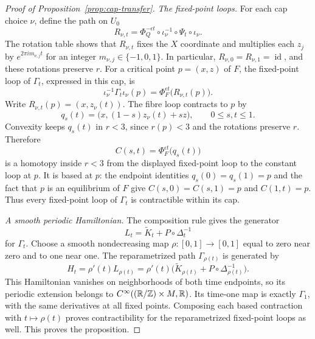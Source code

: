 \begin{proof}[Proof of Proposition~\ref{prop:cap-transfer}]
\smallskip
\noindent\emph{The fixed-point loops.}
For each cap choice $\nu$, define the path on $U_0$
\[
 R_{\nu,t}=\Phi_Q^{-\epsilon t}\circ
             \iota_\nu^{-1}\circ\Psi_t\circ\iota_\nu.
\]
The rotation table shows that $R_{\nu,t}$ fixes the $X$ coordinate
and multiplies each $z_j$ by $e^{2\pi i m_{\nu,j}t}$ for an integer
$m_{\nu,j}\in\{-1,0,1\}$. In particular,
$R_{\nu,0}=R_{\nu,1}=\operatorname{id}$, and these rotations preserve
$r$. For a critical point $p=(x,z)$ of $F$, the fixed-point loop of
$\Gamma_t$, expressed in this cap, is
\[
 \iota_\nu^{-1}\Gamma_t\iota_\nu(p)
   =\Phi_F^{\epsilon t}\bigl(R_{\nu,t}(p)\bigr).
\]
Write $R_{\nu,t}(p)=(x,z_\nu(t))$. The fibre loop contracts to $p$
by
\[
 q_s(t)=\bigl(x,(1-s)z_\nu(t)+sz\bigr),
 \qquad 0\le s,t\le1.
\]
Convexity keeps $q_s(t)$ in $r<3$, since $r(p)<3$ and the rotations
preserve $r$. Therefore
\[
 C(s,t)=\Phi_F^{\epsilon t}\bigl(q_s(t)\bigr)
\]
is a homotopy inside $r<3$ from the displayed fixed-point loop to
the constant loop at $p$. It is based at $p$: the endpoint identities
$q_s(0)=q_s(1)=p$ and the fact that $p$ is an equilibrium of $F$
give $C(s,0)=C(s,1)=p$ and $C(1,t)=p$. Thus every fixed-point loop
of $\Gamma_t$ is contractible within its cap.

\smallskip
\noindent\emph{A smooth periodic Hamiltonian.}
The composition rule gives the generator
\[
 L_t=\widetilde K_t+P\circ\Delta_t^{-1}
\]
for $\Gamma_t$.  Choose a smooth nondecreasing map
$\rho\colon[0,1]\to[0,1]$ equal to zero near zero and to one near
one.  The reparametrized path $\Gamma_{\rho(t)}$ is generated by
\[
 H_t=\rho'(t)L_{\rho(t)}
 =\rho'(t)\bigl(\widetilde K_{\rho(t)}
                  +P\circ\Delta_{\rho(t)}^{-1}\bigr).
\]
This Hamiltonian vanishes on neighborhoods of both time endpoints,
so its periodic extension belongs to
$C^\infty((\mathbb R/\mathbb Z)\times M,\mathbb R)$.  Its time-one map is exactly
$\Gamma_1$, with the same derivatives at all fixed points.
Composing each based contraction with $t\mapsto\rho(t)$ proves
contractibility for the reparametrized fixed-point loops as well.
This proves the proposition.
\end{proof}
